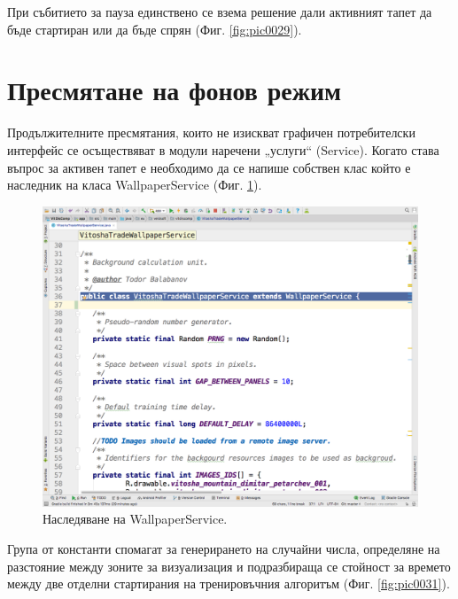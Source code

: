\documentclass[book,14pt,oneside,openany]{memoir}
\begin{document}
При събитието за пауза единствено се взема решение дали активният тапет да бъде стартиран или да бъде спрян (Фиг. \ref{fig:pic0029}). 

\section{Пресмятане на фонов режим}

Продължителните пресмятания, които не изискват графичен потребителски интерфейс се осъществяват в модули наречени „услуги“ (Service). Когато става въпрос за активен тапет е необходимо да се напише собствен клас който е наследник на класа WallpaperService (Фиг. \ref{fig:pic0030}).

\begin{figure}[h]
  \centering
  \includegraphics[height=0.45\pdfpageheight]{./images/pic0030.png}
  \caption{Наследяване на WallpaperService.}
\label{fig:pic0030}
\end{figure}
\FloatBarrier

Група от константи спомагат за генерирането на случайни числа, определяне на разстояние между зоните за визуализация и подразбираща се стойност за времето между две отделни стартирания на тренировъчния алгоритъм (Фиг. \ref{fig:pic0031}). 
\end{document}
